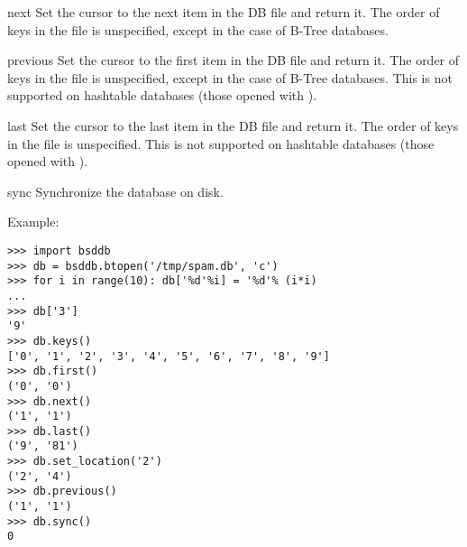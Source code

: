 \begin{methoddesc}{next}{}
Set the cursor to the next item in the DB file and return it.  The order of 
keys in the file is unspecified, except in the case of B-Tree databases.
\end{methoddesc}

\begin{methoddesc}{previous}{}
Set the cursor to the first item in the DB file and return it.  The
order of keys in the file is unspecified, except in the case of B-Tree
databases.  This is not supported on hashtable databases (those opened
with ).
\end{methoddesc}

\begin{methoddesc}{last}{}
Set the cursor to the last item in the DB file and return it.  The
order of keys in the file is unspecified.  This is not supported on
hashtable databases (those opened with ).
\end{methoddesc}

\begin{methoddesc}{sync}{}
Synchronize the database on disk.
\end{methoddesc}

Example:

\begin{verbatim}
>>> import bsddb
>>> db = bsddb.btopen('/tmp/spam.db', 'c')
>>> for i in range(10): db['%d'%i] = '%d'% (i*i)
... 
>>> db['3']
'9'
>>> db.keys()
['0', '1', '2', '3', '4', '5', '6', '7', '8', '9']
>>> db.first()
('0', '0')
>>> db.next()
('1', '1')
>>> db.last()
('9', '81')
>>> db.set_location('2')
('2', '4')
>>> db.previous() 
('1', '1')
>>> db.sync()
0
\end{verbatim}
